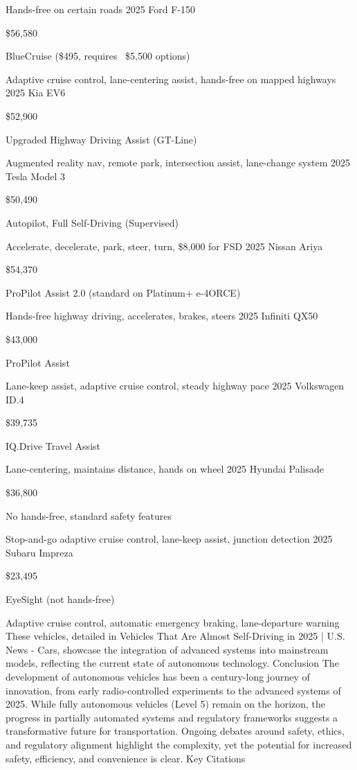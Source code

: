 Hands-free on certain roads
2025 Ford F-150
	
\$56,580
	
BlueCruise (\$495, requires ~\$5,500 options)
	
Adaptive cruise control, lane-centering assist, hands-free on mapped highways
2025 Kia EV6
	
\$52,900
	
Upgraded Highway Driving Assist (GT-Line)
	
Augmented reality nav, remote park, intersection assist, lane-change system
2025 Tesla Model 3
	
\$50,490
	
Autopilot, Full Self-Driving (Supervised)
	
Accelerate, decelerate, park, steer, turn, \$8,000 for FSD
2025 Nissan Ariya
	
\$54,370
	
ProPilot Assist 2.0 (standard on Platinum+ e-4ORCE)
	
Hands-free highway driving, accelerates, brakes, steers
2025 Infiniti QX50
	
\$43,000
	
ProPilot Assist
	
Lane-keep assist, adaptive cruise control, steady highway pace
2025 Volkswagen ID.4
	
\$39,735
	
IQ.Drive Travel Assist
	
Lane-centering, maintains distance, hands on wheel
2025 Hyundai Palisade
	
\$36,800
	
No hands-free, standard safety features
	
Stop-and-go adaptive cruise control, lane-keep assist, junction detection
2025 Subaru Impreza
	
\$23,495
	
EyeSight (not hands-free)
	
Adaptive cruise control, automatic emergency braking, lane-departure warning
These vehicles, detailed in Vehicles That Are Almost Self-Driving in 2025 | U.S. News - Cars, showcase the integration of advanced systems into mainstream models, reflecting the current state of autonomous technology.
Conclusion
The development of autonomous vehicles has been a century-long journey of innovation, from early radio-controlled experiments to the advanced systems of 2025. While fully autonomous vehicles (Level 5) remain on the horizon, the progress in partially automated systems and regulatory frameworks suggests a transformative future for transportation. Ongoing debates around safety, ethics, and regulatory alignment highlight the complexity, yet the potential for increased safety, efficiency, and convenience is clear.
Key Citations

